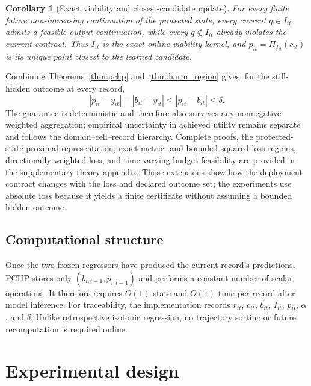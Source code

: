 \documentclass[preprint,12pt]{elsarticle}
\newtheorem{corollary}{Corollary}
\begin{document}
\begin{corollary}[Exact viability and closest-candidate update]
\label{cor:viability_kernel}
\label{cor:optimality}
For every finite future non-increasing continuation of the protected state, every current \(q\in I_{it}\) admits a feasible output continuation, while every \(q\notin I_{it}\) already violates the current contract. Thus \(I_{it}\) is the exact online viability kernel, and \(p_{it}=\Pi_{I_{it}}(c_{it})\) is its unique point closest to the learned candidate.
\end{corollary}

Combining Theorems~\ref{thm:pchp} and~\ref{thm:harm_region} gives, for the still-hidden outcome at every record,
\begin{equation}
 |p_{it}-y_{it}|-|b_{it}-y_{it}|
 \leq |p_{it}-b_{it}|\leq\delta.
 \label{eq:pointwise_harm}
\end{equation}
The guarantee is deterministic and therefore also survives any nonnegative weighted aggregation; empirical uncertainty in achieved utility remains separate and follows the domain--cell--record hierarchy. Complete proofs, the protected-state proximal representation, exact metric- and bounded-squared-loss regions, directionally weighted loss, and time-varying-budget feasibility are provided in the supplementary theory appendix. Those extensions show how the deployment contract changes with the loss and declared outcome set; the experiments use absolute loss because it yields a finite certificate without assuming a bounded hidden outcome.

\subsection{Computational structure}

Once the two frozen regressors have produced the current record's predictions, PCHP stores only $(b_{i,t-1},p_{i,t-1})$ and performs a constant number of scalar operations. It therefore requires $O(1)$ state and $O(1)$ time per record after model inference. For traceability, the implementation records $r_{it}$, $c_{it}$, $b_{it}$, $I_{it}$, $p_{it}$, $\alpha$, and $\delta$. Unlike retrospective isotonic regression, no trajectory sorting or future recomputation is required online.

\section{Experimental design}
\end{document}
